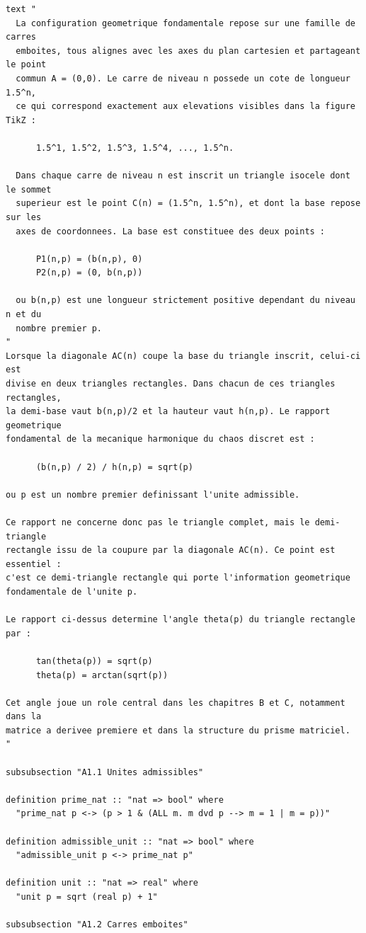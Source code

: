 \documentclass[12pt,a4paper]{article}
\theoremstyle{definition}
\theoremstyle{remark}
\begin{document}
\begin{verbatim}
text "
  La configuration geometrique fondamentale repose sur une famille de carres
  emboites, tous alignes avec les axes du plan cartesien et partageant le point
  commun A = (0,0). Le carre de niveau n possede un cote de longueur 1.5^n,
  ce qui correspond exactement aux elevations visibles dans la figure TikZ :

      1.5^1, 1.5^2, 1.5^3, 1.5^4, ..., 1.5^n.

  Dans chaque carre de niveau n est inscrit un triangle isocele dont le sommet
  superieur est le point C(n) = (1.5^n, 1.5^n), et dont la base repose sur les
  axes de coordonnees. La base est constituee des deux points :

      P1(n,p) = (b(n,p), 0)
      P2(n,p) = (0, b(n,p))

  ou b(n,p) est une longueur strictement positive dependant du niveau n et du
  nombre premier p.
"
Lorsque la diagonale AC(n) coupe la base du triangle inscrit, celui-ci est
divise en deux triangles rectangles. Dans chacun de ces triangles rectangles,
la demi-base vaut b(n,p)/2 et la hauteur vaut h(n,p). Le rapport geometrique
fondamental de la mecanique harmonique du chaos discret est :

      (b(n,p) / 2) / h(n,p) = sqrt(p)

ou p est un nombre premier definissant l'unite admissible.

Ce rapport ne concerne donc pas le triangle complet, mais le demi-triangle
rectangle issu de la coupure par la diagonale AC(n). Ce point est essentiel :
c'est ce demi-triangle rectangle qui porte l'information geometrique
fondamentale de l'unite p.

Le rapport ci-dessus determine l'angle theta(p) du triangle rectangle par :

      tan(theta(p)) = sqrt(p)
      theta(p) = arctan(sqrt(p))

Cet angle joue un role central dans les chapitres B et C, notamment dans la
matrice a derivee premiere et dans la structure du prisme matriciel.
"

subsubsection "A1.1 Unites admissibles"

definition prime_nat :: "nat => bool" where
  "prime_nat p <-> (p > 1 & (ALL m. m dvd p --> m = 1 | m = p))"

definition admissible_unit :: "nat => bool" where
  "admissible_unit p <-> prime_nat p"

definition unit :: "nat => real" where
  "unit p = sqrt (real p) + 1"

subsubsection "A1.2 Carres emboites"


\end{verbatim}
\end{document}
